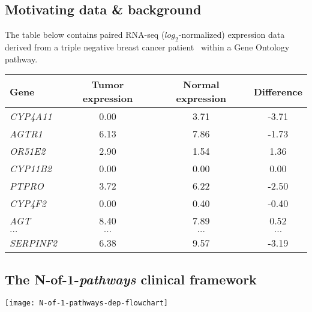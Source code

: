 \documentclass[a0,portrait]{a0poster}
\begin{document}
\begin{multicols}{3}
\subsection{Motivating data \& background}

The table below contains paired RNA-seq ($log_{2}$-normalized) expression data derived from a triple negative breast cancer patient~\cite{weinstein2013cancer} within a Gene Ontology~\cite{Ashburner2000} pathway.\\

\begin{tabular}{l|ccc}
\hline
Gene & Tumor expression &  Normal expression & Difference\\
\hline
  \emph{CYP4A11}   & 0.00  & 3.71  & -3.71 \\
  \emph{AGTR1}     & 6.13  & 7.86  & -1.73 \\
  \emph{OR51E2}    & 2.90  & 1.54  & 1.36 \\
  \emph{CYP11B2}   & 0.00  & 0.00  & \phantom{-}0.00 \\
  \emph{PTPRO}     & 3.72  & 6.22  & -2.50 \\
  \emph{CYP4F2}    & 0.00  & 0.40  & -0.40 \\
  \emph{AGT}       & 8.40  & 7.89  & \phantom{-}0.52 \\
  \emph{$\ldots$}       & $\ldots$  & $\ldots$  & $\ldots$ \\
  \emph{SERPINF2}  & 6.38  & 9.57  & -3.19 \\
\hline
\end{tabular}


\color{Black} %
\subsection{The N-of-1-{\itshape pathways} clinical framework~\cite{Gardeux2014}}

\begin{center}\vspace{1cm}
\texttt{[image: N-of-1-pathways-dep-flowchart]}
\end{center}%


\end{multicols}
\end{document}

